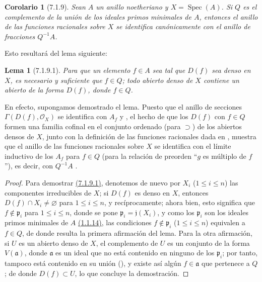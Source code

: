 \documentclass[oneside]{amsart}
\theoremstyle{ega-env-style}
\theoremstyle{ega-thm-env-style}
\newtheorem*{lemma}{Lema}
\newtheorem*{corollary}{Corolario}
\theoremstyle{ega-defn-env-style}
\def\leq{\leqslant}                 %
\let\EGAOriginalLabel\label
\renewcommand{\label}[1]{\phantomsection\EGAOriginalLabel{#1}}
\begin{document}
\begin{corollary}[7.1.9]
\label{I.7.1.9}
Sean $A$ un anillo noetheriano y $X=\operatorname{Spec}(A)$.
Si $Q$ es el complemento de la unión de los ideales primos minimales de $A$, entonces el anillo de las funciones racionales sobre $X$ se identifica canónicamente con el anillo de fracciones $Q^{-1}A$.
\end{corollary}

Esto resultará del lema siguiente:
\begin{lemma}[7.1.9.1]
\label{I.7.1.9.1}
Para que un elemento $f\in A$ sea tal que $D(f)$ sea denso en $X$, es necesario y suficiente que $f\in Q$; todo abierto denso de $X$ contiene un abierto de la forma $D(f)$, donde $f\in Q$.
\end{lemma}

En efecto, supongamos demostrado el lema. Puesto que el anillo de secciones $\Gamma(D(f),\mathscr{O}_X)$ se identifica con $A_f$  y , el hecho de que los $D(f)$ con $f\in Q$ formen una familia cofinal en el conjunto ordenado (para $\supset$) de los abiertos densos de $X$, junto con la definición de las funciones racionales dada en , muestra que el anillo de las funciones racionales sobre $X$ se identifica con el límite inductivo de los $A_f$ para $f\in Q$ (para la relación de preorden ``$g$ es múltiplo de $f$''), es decir, con $Q^{-1}A$ .

\begin{proof}
Para demostrar \hyperref[I.7.1.9.1]{(7.1.9.1)}, denotemos de nuevo por $X_i$ ($1\leq i\leq n$) las componentes irreducibles de $X$; si $D(f)$ es denso en $X$, entonces $D(f)\cap X_i\neq\varnothing$ para $1\leq i\leq n$, y recíprocamente; ahora bien, esto significa que $f\notin\mathfrak{p}_i$ para $1\leq i\leq n$, donde se pone $\mathfrak{p}_i=\mathfrak{j}(X_i)$, y como los $\mathfrak{p}_i$ son los ideales primos minimales de $A$ \hyperref[I.1.1.14]{(1.1.14)}, las condiciones $f\notin\mathfrak{p}_i$ ($1\leq i\leq n$) equivalen a $f\in Q$, de donde resulta la primera afirmación del lema.
Para la otra afirmación, si $U$ es un abierto denso de $X$, el complemento de $U$ es un conjunto de la forma $V(\mathfrak{a})$, donde $\mathfrak{a}$ es un ideal que no está contenido en ninguno de los $\mathfrak{p}_i$; por tanto, tampoco está contenido en su unión (\cite[p.~13]{I-10}), y existe así algún $f\in\mathfrak{a}$ que pertenece a $Q$; de donde $D(f)\subset U$, lo que concluye la demostración.
\end{proof}
\end{document}
